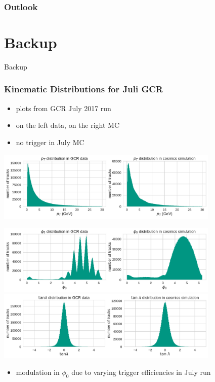 \documentclass[18pt]{beamer}
\begin{document}
\begin{frame}
  \frametitle{Outlook}
  
\end{frame}

\section{Backup}

\begin{frame}
  \begin{center}
    \huge Backup
  \end{center}
\end{frame}

\begin{frame}
  \frametitle{Kinematic Distributions for Juli GCR}
  \begin{itemize}
  \item plots from GCR July 2017 run
  \item on the left data, on the right MC
  \item no trigger in July MC

  \end{itemize}
  \begin{center}
    \includegraphics[width=0.8\textwidth]{figures/distributions/gcr_pt_distribution_uncut.pdf}\\
  \end{center}
\end{frame}

\begin{frame}
  \begin{center}
    \includegraphics[width=0.8\textwidth]{figures/distributions/gcr_phi0_distribution_uncut.pdf}\\
    \includegraphics[width=0.8\textwidth]{figures/distributions/gcr_tan_lambda_distribution_uncut.pdf}
  \end{center}
  \begin{itemize}
  \item modulation in $\phi_0$ due to varying trigger efficiencies in July run
  \end{itemize}
\end{frame}
\end{document}
